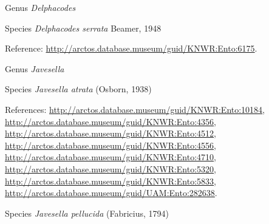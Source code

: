 \documentclass[9pt, article]{memoir}
\begin{document}
\begin{multicols}{2}
\vspace{6pt}\noindent\hspace{30pt}Genus \textit{Delphacodes}


\vspace{6pt}\noindent\hspace{36pt}Species \textit{Delphacodes serrata} Beamer, 1948


\vspace{6pt}Reference: 
\url{http://arctos.database.museum/guid/KNWR:Ento:6175}.

\vspace{6pt}\noindent\hspace{30pt}Genus \textit{Javesella}


\vspace{6pt}\noindent\hspace{36pt}Species \textit{Javesella atrata} (Osborn, 1938)


\vspace{6pt}References: 
\url{http://arctos.database.museum/guid/KNWR:Ento:10184}, 
\url{http://arctos.database.museum/guid/KNWR:Ento:4356}, 
\url{http://arctos.database.museum/guid/KNWR:Ento:4512}, 
\url{http://arctos.database.museum/guid/KNWR:Ento:4556}, 
\url{http://arctos.database.museum/guid/KNWR:Ento:4710}, 
\url{http://arctos.database.museum/guid/KNWR:Ento:5320}, 
\url{http://arctos.database.museum/guid/KNWR:Ento:5833}, 
\url{http://arctos.database.museum/guid/UAM:Ento:282638}.

\vspace{6pt}\noindent\hspace{36pt}Species \textit{Javesella pellucida} (Fabricius, 1794)



\end{multicols}
\end{document}
